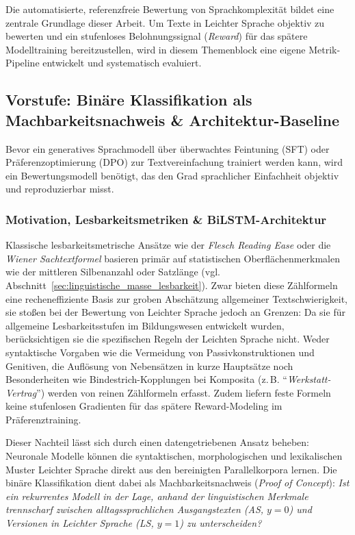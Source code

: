 Die automatisierte, referenzfreie Bewertung von Sprachkomplexität bildet eine zentrale Grundlage dieser Arbeit. Um Texte in Leichter Sprache objektiv zu bewerten und ein stufenloses Belohnungssignal (\textit{Reward}) für das spätere Modelltraining bereitzustellen, wird in diesem Themenblock eine eigene Metrik-Pipeline entwickelt und systematisch evaluiert.

\subsection{Vorstufe: Binäre Klassifikation als Machbarkeitsnachweis \& Architektur-Baseline}
\label{sec:klassifikationsmodelle}

Bevor ein generatives Sprachmodell über überwachtes Feintuning (SFT) oder Präferenzoptimierung (DPO) zur Textvereinfachung trainiert werden kann, wird ein Bewertungsmodell benötigt, das den Grad sprachlicher Einfachheit objektiv und reproduzierbar misst.

\subsubsection{Motivation, Lesbarkeitsmetriken \& BiLSTM-Architektur}
\label{sec:klassifikation_motivation}

Klassische lesbarkeitsmetrische Ansätze wie der \textit{Flesch Reading Ease} \citep{amstad1978verstaendlich} oder die \textit{Wiener Sachtextformel} \citep{bamberger1984lesen} basieren primär auf statistischen Oberflächenmerkmalen wie der mittleren Silbenanzahl oder Satzlänge (vgl. Abschnitt~\ref{sec:linguistische_masse_lesbarkeit}). Zwar bieten diese Zählformeln eine recheneffiziente Basis zur groben Abschätzung allgemeiner Textschwierigkeit, sie stoßen bei der Bewertung von Leichter Sprache jedoch an Grenzen: Da sie für allgemeine Lesbarkeitsstufen im Bildungswesen entwickelt wurden, berücksichtigen sie die spezifischen Regeln der Leichten Sprache nicht. Weder syntaktische Vorgaben wie die Vermeidung von Passivkonstruktionen und Genitiven, die Auflösung von Nebensätzen in kurze Hauptsätze noch Besonderheiten wie Bindestrich-Kopplungen bei Komposita (z.\,B. \enquote{\textit{Werkstatt-Vertrag}}) werden von reinen Zählformeln erfasst. Zudem liefern feste Formeln keine stufenlosen Gradienten für das spätere Reward-Modeling im Präferenztraining.

Dieser Nachteil lässt sich durch einen datengetriebenen Ansatz beheben: Neuronale Modelle können die syntaktischen, morphologischen und lexikalischen Muster Leichter Sprache direkt aus den bereinigten Parallelkorpora lernen. Die binäre Klassifikation dient dabei als Machbarkeitsnachweis (\textit{Proof of Concept}): \textit{Ist ein rekurrentes Modell in der Lage, anhand der linguistischen Merkmale trennscharf zwischen alltagssprachlichen Ausgangstexten (AS, $y=0$) und Versionen in Leichter Sprache (LS, $y=1$) zu unterscheiden?}

